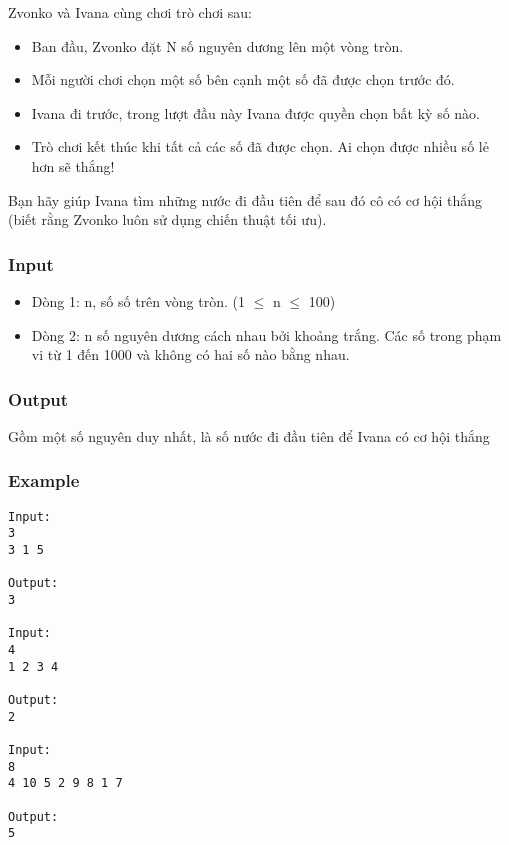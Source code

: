 



   Zvonko và Ivana cùng chơi trò chơi sau:  
\begin{itemize}
	\item     Ban đầu, Zvonko đặt N số nguyên dương lên một vòng tròn.   
	\item     Mỗi người chơi chọn một số bên cạnh một số đã được chọn trước đó.   
	\item     Ivana đi trước, trong lượt đầu này Ivana được quyền chọn bất kỳ số nào.   
	\item     Trò chơi kết thúc khi tất cả các số đã được chọn. Ai chọn được nhiều số lẻ hơn sẽ thắng!   
\end{itemize}

   Bạn hãy giúp Ivana tìm những nước đi đầu tiên để sau đó cô có cơ hội thắng (biết rằng Zvonko luôn sử dụng chiến thuật tối ưu).  

\subsubsection{   Input  }
\begin{itemize}
	\item     Dòng 1: n, số số trên vòng tròn. (1 $\le$ n $\le$ 100)   
	\item     Dòng 2: n số nguyên dương cách nhau bởi khoảng trắng. Các số trong phạm vi từ 1 đến 1000 và không có hai số nào bằng nhau.   
\end{itemize}

\subsubsection{   Output  }

   Gồm một số nguyên duy nhất, là số nước đi đầu tiên để Ivana có cơ hội thắng  

\subsubsection{   Example  }
\begin{verbatim}
Input:
3
3 1 5

Output:
3

Input:
4
1 2 3 4

Output:
2

Input:
8
4 10 5 2 9 8 1 7

Output:
5
\end{verbatim}
